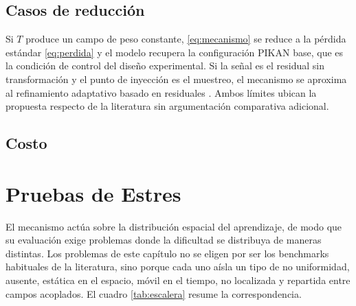 
\subsection{Casos de reducción}

Si $T$ produce un campo de peso constante, \eqref{eq:mecanismo} se reduce a la pérdida estándar \eqref{eq:perdida} y el modelo recupera la configuración PIKAN base, que es la condición de control del diseño experimental. Si la señal es el residual sin transformación y el punto de inyección es el muestreo, el mecanismo se aproxima al refinamiento adaptativo basado en residuales \cite{lu2021deepxde}. Ambos límites ubican la propuesta respecto de la literatura sin argumentación comparativa adicional.

\subsection{Costo}


\section{Pruebas de Estres}

El mecanismo actúa sobre la distribución espacial del aprendizaje, de
modo que su evaluación exige problemas donde la dificultad se distribuya
de maneras distintas. Los problemas de este capítulo no se eligen por ser
los benchmarks habituales de la literatura, sino porque cada uno aísla un
tipo de no uniformidad,  ausente, estática en el espacio, móvil en el
tiempo, no localizada y repartida entre campos acoplados. El cuadro
\ref{tab:escalera} resume la correspondencia.

